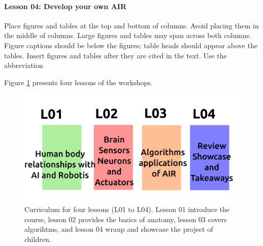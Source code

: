 \documentclass[conference]{IEEEtran}
\begin{document}
\paragraph{Lesson 04: Develop your own AIR} 
Place figures and tables at the top and bottom of columns. Avoid placing them in the middle of columns. 
Large figures and tables may span across both columns. Figure captions should be below the figures; table heads should appear above the tables. 
Insert figures and tables after they are cited in the text. Use the abbreviation 

Figure \ref{fig:curriculum} presents four lessons of the workshops.
\begin{figure}[htbp]
    \centerline{\includegraphics[width=\linewidth]{curriculum-design/versions/drawing-v00.png}}
    \caption{Curriculum for four lessons (L01 to L04). 
    Lesson 01 introduce the course, 
    lesson 02 provides the basics of anatomy, 
    lesson 03 covers algorihtms, and 
    lesson 04 wraup and showcase the project of children.
    }
    \label{fig:curriculum}
\end{figure}

\end{document}
